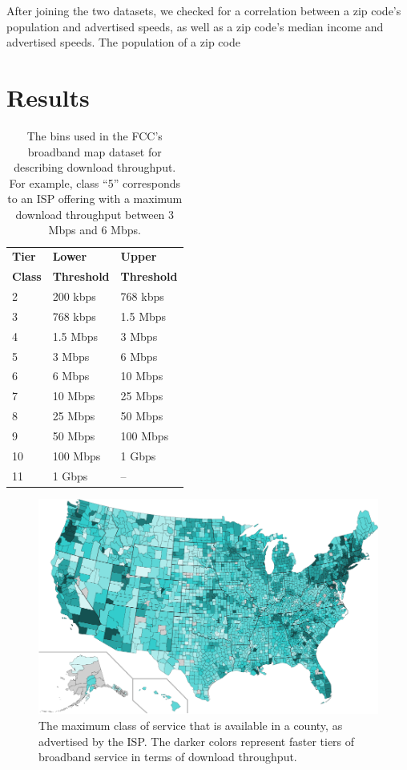 \documentclass{sig-alternate-10pt}
\begin{document}
After joining the two datasets, we checked for a correlation between a zip 
code's population and advertised speeds, as well as a zip code's median income
and advertised speeds.  The population of a zip code

\section{Results}
\label{sec:results} 

\begin{table}
    \centering
    \small
    \begin{tabular}{ | l | l | l |}
    \hline
    \textbf{Tier} & \textbf{Lower} & \textbf{Upper} \\
    \textbf{Class} & \textbf{Threshold} & \textbf{Threshold} \\ \hline
    2 & 200 kbps & 768 kbps \\ \hline
    3 & 768 kbps & 1.5 Mbps \\ \hline
    4 & 1.5 Mbps & 3 Mbps \\ \hline
    5 & 3 Mbps & 6 Mbps \\ \hline
    6 & 6 Mbps & 10 Mbps \\ \hline
    7 & 10 Mbps & 25 Mbps \\ \hline
    8 & 25 Mbps & 50 Mbps \\ \hline
    9 & 50 Mbps & 100 Mbps\\ \hline
    10 & 100 Mbps & 1 Gbps\\ \hline
    11 & 1 Gbps & -- \\ \hline
    \end{tabular}
\caption{The bins used in the FCC's broadband map dataset 
for describing download throughput.
For example, class ``5'' corresponds to an ISP offering 
with a maximum download throughput between 3 Mbps and
6 Mbps.}
\label{table:service-classes}
\end{table}

\begin{figure}
\centering
        \includegraphics[width=0.9\linewidth]{figs/counties_maxDown.pdf}
  \caption{The maximum class of service that is available in a county, as
advertised by the ISP.  The
darker colors represent faster tiers of broadband service in terms of 
download throughput.}
  \label{fig:services-repMaxRepDown}
\end{figure}
\end{document}
